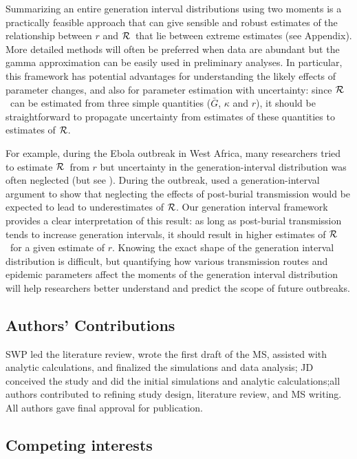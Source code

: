 \documentclass[12pt]{article}
\newcommand{\RR}{\ensuremath{{\cal R}}}
\begin{document}
Summarizing an entire generation interval distributions using two moments is a practically feasible approach that can give sensible and robust estimates of the relationship between $r$ and \RR\ that lie between extreme estimates (see Appendix).
More detailed methods will often be preferred when data are abundant but the gamma approximation can be easily used in preliminary analyses.
In particular, this framework has potential advantages for understanding the likely effects of parameter changes, and also for parameter estimation with uncertainty: since \RR\ can be estimated from three simple quantities ($\bar G$, $\kappa$ and $r$), it should be straightforward to propagate uncertainty from estimates of these quantities to estimates of \RR.

For example, during the Ebola outbreak in West Africa, many researchers tried to estimate \RR\ from $r$ \cite{Alth14, AylwBarb14, NishChow15, RiveLofgren14, 
KingDome15} but uncertainty in the generation-interval distribution was often neglected (but see \cite{TaylDush16}).  
During the outbreak, \cite{WeitDush15} used a generation-interval argument to show that neglecting the effects of post-burial transmission would be expected to lead to underestimates of \RR.
Our generation interval framework provides a clear interpretation of this result: as long as post-burial transmission tends to increase generation intervals, it should result in higher estimates of \RR\ for a given estimate of $r$.
Knowing the exact shape of the generation interval distribution is difficult, but quantifying how various transmission routes and epidemic parameters affect the moments of the generation interval distribution will help researchers better understand and predict the scope of future outbreaks.

\subsection*{Authors' Contributions}

SWP led the literature review, wrote the first draft of the MS, assisted with analytic calculations, and finalized the simulations and data analysis; JD conceived the study and did the initial simulations and analytic calculations;all authors contributed to refining study design, literature review, and MS writing. All authors gave final approval for publication.

\subsection*{Competing interests}
\end{document}
